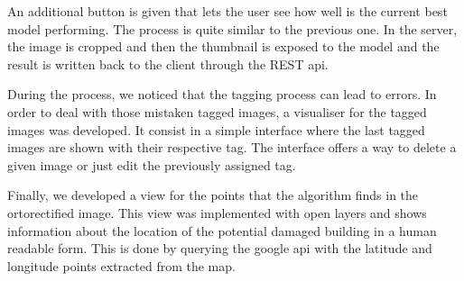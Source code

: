 \begin{figure}[h]
  \begin{center}
  \end{center}
\end{figure}

An additional button is given that lets the user see how well is the current best model performing. The process is quite similar to the previous one. In the server, the image is cropped and then the thumbnail is exposed to the model and the result is written back to the client through the REST api.

\begin{figure}[h]
  \begin{center}
  \end{center}
\end{figure}


\begin{figure}[h]
  \begin{center}
  \end{center}
\end{figure}

During the process, we noticed that the tagging process can lead to errors. In order to deal with those mistaken tagged images, a visualiser for the tagged images was developed. It consist in a simple interface where the last tagged images are shown with their respective tag. The interface offers a way to delete a given image or just edit the previously assigned tag.

\begin{figure}[h]
  \begin{center}
  \end{center}
\end{figure}
Finally, we developed a view for the points that the algorithm finds in the ortorectified image. This view was implemented with open layers and shows information about the location of the potential damaged building in a human readable form. This is done by querying the google api with the latitude and longitude points extracted from the map.

